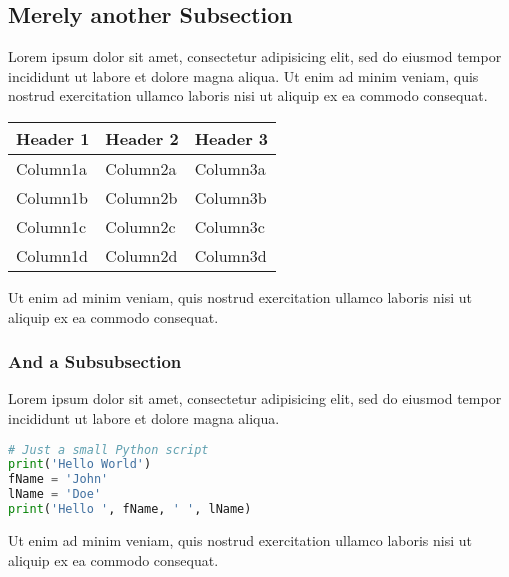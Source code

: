 \documentclass{modernCS}
\begin{document}
\subsection{Merely another Subsection}
Lorem ipsum dolor sit amet, consectetur adipisicing elit, sed do eiusmod
tempor incididunt ut labore et dolore magna aliqua. Ut enim ad minim veniam, quis nostrud exercitation ullamco laboris nisi ut aliquip ex ea commodo consequat.
\begin{center}
\begin{tabular}{lll}
\toprule
Header 1 & Header 2 & Header 3 \\
\midrule
Column1a & Column2a & Column3a \\
Column1b & Column2b & Column3b \\
Column1c & Column2c & Column3c \\
Column1d & Column2d & Column3d \\
\bottomrule
\end{tabular}
\end{center}
Ut enim ad minim veniam,
quis nostrud exercitation ullamco laboris nisi ut aliquip ex ea commodo
consequat.

\subsubsection{And a Subsubsection}
Lorem ipsum dolor sit amet, consectetur adipisicing elit, sed do eiusmod
tempor incididunt ut labore et dolore magna aliqua.
\begin{lstlisting}[language=Python]
# Just a small Python script
print('Hello World')
fName = 'John'
lName = 'Doe'
print('Hello ', fName, ' ', lName)
\end{lstlisting}
Ut enim ad minim veniam,
quis nostrud exercitation ullamco laboris nisi ut aliquip ex ea commodo
consequat.
\end{document}
